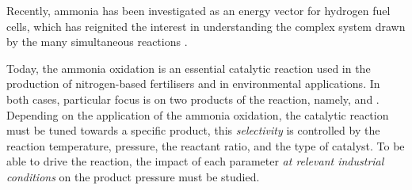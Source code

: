 Recently, ammonia has been investigated as an energy vector for hydrogen fuel cells, which has reignited the interest in understanding the complex system drawn by the many simultaneous reactions \parencite{Afif2016, Georgina2021}.

Today, the ammonia oxidation is an essential catalytic reaction used in the production of nitrogen-based fertilisers and in environmental applications.
In both cases, particular focus is on two products of the reaction, namely,  and .
Depending on the application of the ammonia oxidation, the catalytic reaction must be tuned towards a specific product, this \textit{selectivity} is controlled by the reaction temperature, pressure, the  reactant ratio, and the type of catalyst.
To be able to drive the reaction, the impact of each parameter \textit{at relevant industrial conditions} on the product pressure must be studied.


